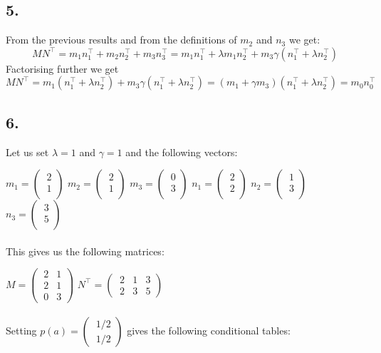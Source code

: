 \documentclass[11pt,a4paper,oneside]{report}
\begin{document}
\subsection*{5.}

From the previous results and from the definitions of $m_2$ and $n_3$ we get:
$$MN^\top = m_1n_1^\top + m_2n_2^\top + m_3n_3^\top = m_1n_1^\top + \lambda 
m_1n_2^\top + m_3\gamma(n_1^\top + \lambda n_2^\top)$$
Factorising further we get
$$MN^\top = m_1(n_1^\top + \lambda n_2^\top) + m_3\gamma (n_1^\top + \lambda 
n_2^\top) = (m_1 + \gamma m_3)(n_1^\top + \lambda n_2^\top) = m_0n_0^\top$$

\subsection*{6.}

Let us set $\lambda = 1$ and $\gamma = 1$ and the following vectors:

$m_1 =   
 \begin{pmatrix}
   \ 2  \\[0.4em]
   \ 1  \\
 \end{pmatrix} 
$  
$m_2 =   
 \begin{pmatrix}
   \ 2  \\[0.4em]
   \ 1  \\
 \end{pmatrix} 
$  
$m_3 =   
 \begin{pmatrix}
   \ 0  \\[0.4em]
   \ 3  \\
 \end{pmatrix} 
$  
$n_1 =   
 \begin{pmatrix}
   \ 2  \\[0.4em]
   \ 2  \\
 \end{pmatrix} 
$  
$n_2 =   
 \begin{pmatrix}
   \ 1  \\[0.4em]
   \ 3  \\
 \end{pmatrix} 
$  
$n_3 =   
 \begin{pmatrix}
   \ 3  \\[0.4em]
   \ 5  \\
 \end{pmatrix}
 $\\\\
This gives us the following matrices:

$ M = 
 \begin{pmatrix}
   \ 2 & 1 \\[0.4em]
   \ 2 & 1 \\[0.4em]
   \ 0 & 3
 \end{pmatrix}
$
$ N^\top = 
 \begin{pmatrix}
   \ 2 & 1 & 3 \\[0.4em]
   \ 2 & 3 & 5
 \end{pmatrix}
$\\\\
Setting $p(a) = 
 \begin{pmatrix}
   \ 1/2 \\[0.4em]
   \ 1/2
 \end{pmatrix}
$ gives the following conditional tables:
\end{document}
